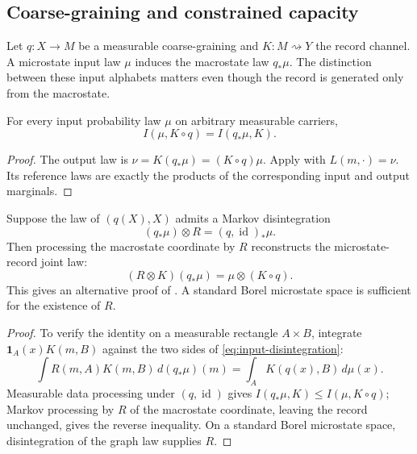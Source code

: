 \subsection{Coarse-graining and constrained capacity}
\label{sec:input-capacity}

Let $q:X\to M$ be a measurable coarse-graining and
$K:M\rightsquigarrow Y$ the record channel. A microstate input law
$\mu$ induces the macrostate law $q_*\mu$. The distinction between
these input alphabets matters even though the record is generated
only from the macrostate.

\begin{theorem}
\label{thm:input-information}
For every input probability law $\mu$ on arbitrary measurable carriers,
\[
 I(\mu,K\circ q)=I(q_*\mu,K).
\]
\end{theorem}
\begin{proof}
The output law is $\nu=K(q_*\mu)=(K\circ q)\mu$.
Apply  with $L(m,\cdot)=\nu$.
Its reference laws are exactly the products of the corresponding
input and output marginals.
\end{proof}

\begin{proposition}
\label{prop:input-disintegration}
Suppose the law of $(q(X),X)$ admits a Markov disintegration
\begin{equation}\label{eq:input-disintegration}
 (q_*\mu)\otimes R=(q,\operatorname{id})_*\mu.
\end{equation}
Then processing the macrostate coordinate by $R$ reconstructs the
microstate-record joint law:
\[
 (R\otimes K)(q_*\mu)=\mu\otimes(K\circ q).
\]
This gives an alternative proof of .
A standard Borel microstate space is sufficient for the existence of $R$.
\end{proposition}
\begin{proof}
To verify the identity on a measurable rectangle $A\times B$,
integrate $\mathbf1_A(x)K(m,B)$ against the two sides of
\eqref{eq:input-disintegration}:
\[
 \int R(m,A)K(m,B)\,d(q_*\mu)(m)
 =\int_A K(q(x),B)\,d\mu(x).
\]
Measurable data processing under $(q,\operatorname{id})$ gives
$I(q_*\mu,K)\le I(\mu,K\circ q)$; Markov processing by $R$ of the
macrostate coordinate, leaving the record unchanged, gives the reverse
inequality. On a standard
Borel microstate space, disintegration of the graph law supplies $R$.
\end{proof}

